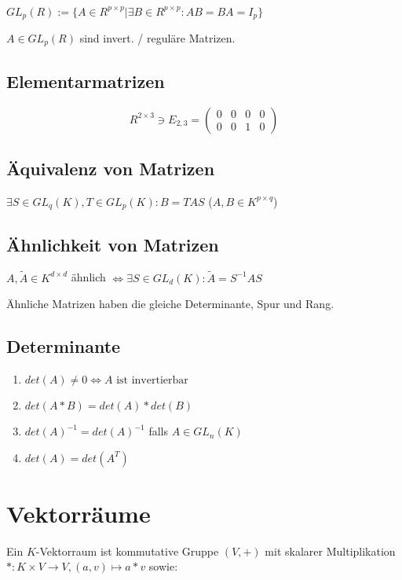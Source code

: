 $GL_p(R) := \{ A \in R^{p \times p} | \exists B \in R^{p \times p} : AB = BA = I_p \}$

$A \in GL_p(R)$ sind invert. / reguläre Matrizen.

\subsection*{Elementarmatrizen}

$$R^{2 \times 3} \ni E_{2,3} = \begin{pmatrix}
	0 & 0 & 0 & 0 \\
	0 & 0 & 1 & 0
\end{pmatrix}$$

\subsection*{Äquivalenz von Matrizen}

$\exists S \in GL_q(K), T \in GL_p(K) : B = T A S$ ($A, B \in K^{p \times q}$)

\subsection*{Ähnlichkeit von Matrizen}

$A, \tilde A \in K^{d \times d}$ ähnlich $\Leftrightarrow \exists S \in GL_d(K) : \tilde A = S^{-1}AS$

Ähnliche Matrizen haben die gleiche Determinante, Spur und Rang.

\subsection*{Determinante}

\begin{enumerate}[label=(\alph*)]
	\item $det(A) \neq 0 \Leftrightarrow A \text{ ist invertierbar}$
	\item $det(A*B) = det(A) * det(B)$
	\item $det(A)^{-1} = det(A)^{-1}$ falls $A \in GL_n(K)$
	\item $det(A) = det(A^T)$
\end{enumerate}

\section*{Vektorräume}

Ein $K$-Vektorraum ist kommutative Gruppe $(V, +)$ mit skalarer Multiplikation $* : K \times V \rightarrow V, (a, v) \mapsto a * v$ sowie:

